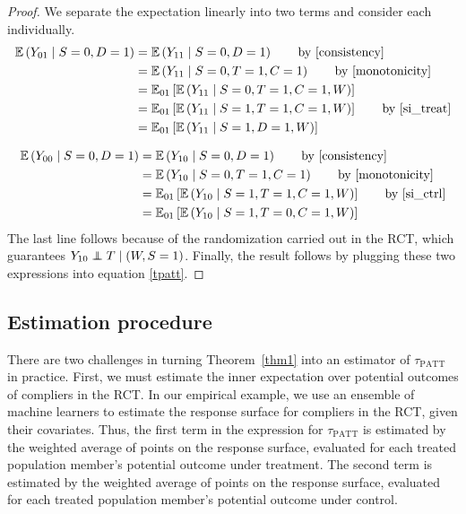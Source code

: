 \documentclass[12pt]{article}
\newcommand{\ex}{\mathbb{E}} %
\newcommand\independent{\protect\mathpalette{\protect\independenT}{\perp}}
\def\independenT#1#2{\mathrel{\rlap{$#1#2$}\mkern2mu{#1#2}}}
\begin{document}
\begin{proof}
We separate the expectation linearly into two terms and consider each individually.
\begin{align*}
\ex\left(Y_{01} \mid S=0,D=1\right) &= \ex\left(Y_{11} \mid S=0, D=1\right) \tag*{by \eqref{consistency}} \\
&= \ex\left(Y_{11} \mid S=0, T=1, C=1\right) \tag*{by \eqref{monotonicity}} \\
&= \ex_{01}\left[  \ex\left(Y_{11} \mid S=0, T=1, C=1, W\right) \right] \\
&= \ex_{01}\left[  \ex\left(Y_{11} \mid S=1, T=1, C=1, W\right) \right] \tag*{by \eqref{si_treat}} \\
&= \ex_{01}\left[  \ex\left(Y_{11} \mid S=1, D=1, W\right)\right]
\end{align*}

\begin{align*}
\ex\left(Y_{00} \mid S=0, D=1\right) &= \ex\left(Y_{10} \mid S=0, D=1\right) \tag*{by \eqref{consistency}} \\
&= \ex\left(Y_{10} \mid S=0, T=1, C=1\right) \tag*{by \eqref{monotonicity}} \\
&= \ex_{01}\left[  \ex\left(Y_{10} \mid S=1, T=1, C=1, W\right) \right] \tag*{by \eqref{si_ctrl}} \\
&= \ex_{01}\left[  \ex\left(Y_{10} \mid S=1, T=0, C=1, W\right) \right] \\
\end{align*}
The last line follows because of the randomization carried out in the RCT, which guarantees $Y_{10} \independent T \mid (W, S=1)$.  Finally, the result follows by plugging these two expressions into equation \eqref{tpatt}.
\end{proof}

\subsection{Estimation procedure}
There are two challenges in turning Theorem~\ref{thm1} into an estimator of $\tau_{\text{PATT}}$ in practice.  First, we must estimate the inner expectation over potential outcomes of compliers in the RCT.  In our empirical example, we use an ensemble of machine learners \citep{van2007} to estimate the response surface for compliers in the RCT, given their covariates.  Thus, the first term in the expression for $\tau_{\text{PATT}}$ is estimated by the weighted average of points on the response surface, evaluated for each treated population member's potential outcome under treatment.  The second term is estimated by the weighted average of points on the response surface, evaluated for each treated population member's potential outcome under control.
\end{document}
